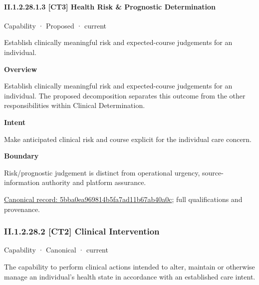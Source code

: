 \paragraph*{II.1.2.28.1.3 [CT3] Health Risk \& Prognostic Determination}
\label{navigation:II.1.2.28.1.3}

\label{element:5bba0ea969814b5fa7ad11b67ab40a0c}
{\small Capability · Proposed · current}\par

Establish clinically meaningful risk and expected-course judgements for an individual.



\textbf{Overview}



Establish clinically meaningful risk and expected-course judgements for an individual. The proposed decomposition separates this outcome from the other responsibilities within Clinical Determination.



\textbf{Intent}



Make anticipated clinical risk and course explicit for the individual care concern.



\textbf{Boundary}



Risk/prognostic judgement is distinct from operational urgency, source-information authority and platform assurance.


{\footnotesize \href{../../../../continuum/strategy/capability/5bba0ea969814b5fa7ad11b67ab40a0c.md}{Canonical record: 5bba0ea969814b5fa7ad11b67ab40a0c}; full qualifications and provenance.}\par
\subsubsection*{II.1.2.28.2 [CT2] Clinical Intervention}
\label{navigation:II.1.2.28.2}

\label{element:5359d1b0ff814a0e871384469f5ebcd7}
{\small Capability · Canonical · current}\par

The capability to perform clinical actions intended to alter, maintain or otherwise manage an individual's health state in accordance with an established care intent.



